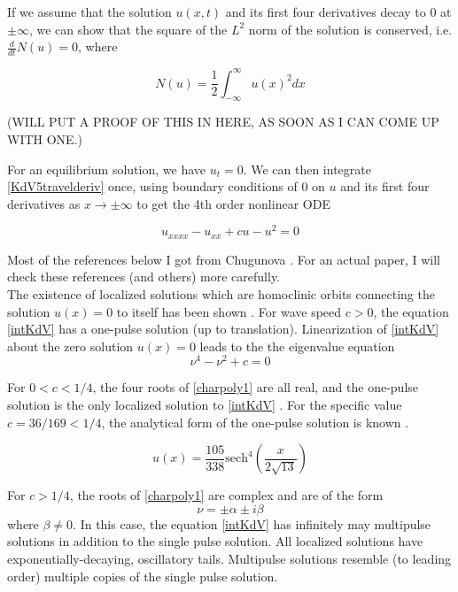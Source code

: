 \documentclass[12pt]{article}
\begin{document}
If we assume that the solution $u(x, t)$ and its first four derivatives decay to 0 at $\pm \infty$, we can show that the square of the $L^2$ norm of the solution is conserved, i.e. $\frac{d}{dt}N(u) = 0$, where

\begin{equation} \label{L2norm}
N(u) = \frac{1}{2} \int_{-\infty}^\infty u(x)^2 dx
\end{equation}

(WILL PUT A PROOF OF THIS IN HERE, AS SOON AS I CAN COME UP WITH ONE.)

For an equilibrium solution, we have $u_t = 0$. We can then integrate \eqref{KdV5travelderiv} once, using boundary conditions of 0 on $u$ and its first four derivatives as $x \rightarrow \pm \infty$ to get the 4th order nonlinear ODE

\begin{equation} \label{intKdV}
u_{xxxx} - u_{xx} + c u - u^2 = 0
\end{equation}

Most of the references below I got from Chugunova \cite{Pelinovsky2007}. For an actual paper, I will check these references (and others) more carefully.\\

The existence of localized solutions which are homoclinic orbits connecting the solution $u(x) = 0$ to itself has been shown \cite{Champneys1998}. For wave speed $c > 0$, the equation \eqref{intKdV} has a one-pulse solution (up to translation). Linearization of \eqref{intKdV} about the zero solution $u(x) = 0$ leads to the the eigenvalue equation
\begin{equation} \label{charpoly1}
\nu^4 - \nu^2 + c = 0
\end{equation}

For $0 < c < 1/4$, the four roots of \eqref{charpoly1} are all real, and the one-pulse solution is the only localized solution to \eqref{intKdV} \cite{Groves1997}. For the specific value $c = 36/169 < 1/4$, the analytical form of the one-pulse solution is known \cite{Pelinovsky2007}.

\begin{equation} \label{exact}
u(x) = \frac{105}{338}\textrm{sech}^4\left(\frac{x}{2\sqrt{13}} \right)
\end{equation}

For $c > 1/4$, the roots of \eqref{charpoly1} are complex and are of the form
\begin{equation} \label{alphabeta}
\nu = \pm \alpha \pm i \beta
\end{equation}
where $\beta \neq 0$. In this case, the equation \eqref{intKdV} has infinitely may multipulse solutions in addition to the single pulse solution. All localized solutions have  exponentially-decaying, oscillatory tails. Multipulse solutions resemble (to leading order) multiple copies of the single pulse solution.\\
\end{document}
